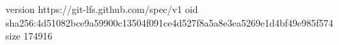 version https://git-lfs.github.com/spec/v1
oid sha256:4d51082bce9a59900c13504f091ce4d527f8a5a8e3ea5269e1d4bf49e985f574
size 174916
